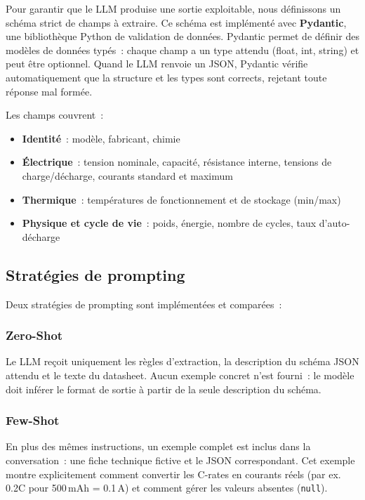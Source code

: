 \documentclass[12pt,a4paper]{article}
\begin{document}
Pour garantir que le LLM produise une sortie exploitable, nous d\'efinissons un sch\'ema strict de champs \`a extraire. Ce sch\'ema est impl\'ement\'e avec \textbf{Pydantic}, une biblioth\`eque Python de validation de donn\'ees. Pydantic permet de d\'efinir des mod\`eles de donn\'ees typ\'es~: chaque champ a un type attendu (float, int, string) et peut \^etre optionnel. Quand le LLM renvoie un JSON, Pydantic v\'erifie automatiquement que la structure et les types sont corrects, rejetant toute r\'eponse mal form\'ee.

Les champs couvrent~:
\begin{itemize}[noitemsep]
    \item \textbf{Identit\'e}~: mod\`ele, fabricant, chimie
    \item \textbf{\'Electrique}~: tension nominale, capacit\'e, r\'esistance interne, tensions de charge/d\'echarge, courants standard et maximum
    \item \textbf{Thermique}~: temp\'eratures de fonctionnement et de stockage (min/max)
    \item \textbf{Physique et cycle de vie}~: poids, \'energie, nombre de cycles, taux d'auto-d\'echarge
\end{itemize}

\subsection{Strat\'egies de prompting}

Deux strat\'egies de prompting sont impl\'ement\'ees et compar\'ees~:

\subsubsection{Zero-Shot}
Le LLM re\c{c}oit uniquement les r\`egles d'extraction, la description du sch\'ema JSON attendu et le texte du datasheet. Aucun exemple concret n'est fourni~: le mod\`ele doit inf\'erer le format de sortie \`a partir de la seule description du sch\'ema.

\subsubsection{Few-Shot}
En plus des m\^emes instructions, un exemple complet est inclus dans la conversation~: une fiche technique fictive et le JSON correspondant. Cet exemple montre explicitement comment convertir les C-rates en courants r\'eels (par ex. 0.2C pour 500\,mAh = 0.1\,A) et comment g\'erer les valeurs absentes (\texttt{null}).
\end{document}
